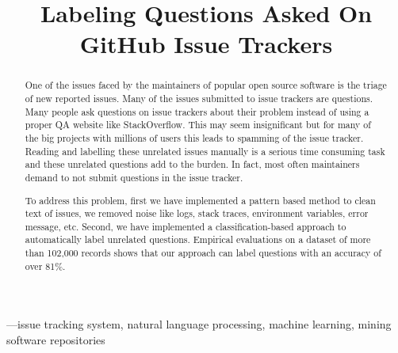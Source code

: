\documentclass[conference]{IEEEtran}
\begin{document}
\title{Labeling Questions Asked On GitHub Issue Trackers\\
}

\author{
}

\maketitle


\begin{abstract}
  One of the issues faced by the maintainers of popular open source software is the triage 
  of new reported issues. Many of the issues submitted to issue trackers are questions.
  Many people ask questions on issue trackers about their problem instead of using a proper QA 
  website like StackOverflow. This may seem insignificant but for many of the big projects 
  with millions of users this leads to spamming of the issue tracker. Reading and labelling
  these unrelated issues manually is a serious time consuming task and these unrelated questions 
  add to the burden. In fact, most often maintainers demand to not submit questions in the 
  issue tracker.

  To address this problem, first we have implemented a pattern based method
  to clean text of issues, we removed noise like logs, stack traces, environment variables, 
  error message, etc.
  Second, we have implemented a classification-based approach to automatically label unrelated questions. 
  Empirical evaluations on a dataset of more than 102,000 records shows that our approach 
  can label questions with an accuracy of over 81\%. 
\end{abstract}  

\begin{IEEEkeywords}
  —issue tracking system, natural language processing, machine learning, mining software repositories
\end{IEEEkeywords}
\end{document}
